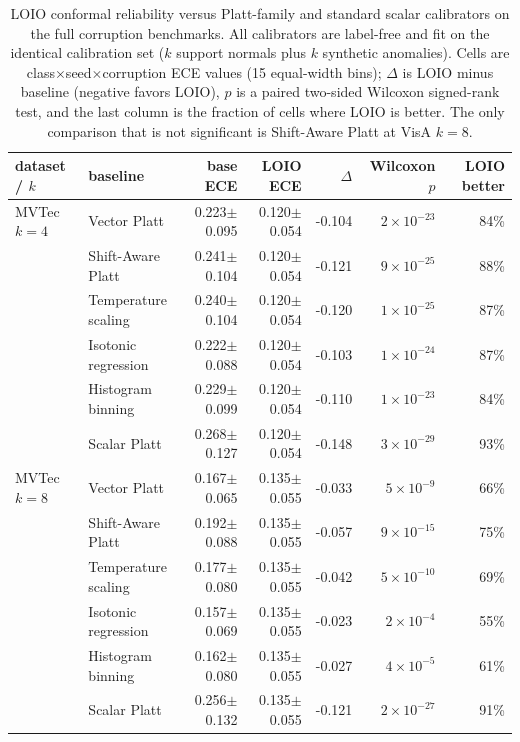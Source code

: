 \begin{table}[t]
\centering
\caption{LOIO conformal reliability versus Platt-family and standard scalar calibrators on the full corruption benchmarks. All calibrators are label-free and fit on the identical calibration set ($k$ support normals plus $k$ synthetic anomalies). Cells are class$\times$seed$\times$corruption ECE values (15 equal-width bins); $\Delta$ is LOIO minus baseline (negative favors LOIO), $p$ is a paired two-sided Wilcoxon signed-rank test, and the last column is the fraction of cells where LOIO is better. The only comparison that is not significant is Shift-Aware Platt at VisA $k{=}8$.}
\label{tab:scalar-calibrators}
\footnotesize
\setlength{\tabcolsep}{3pt}
\begin{tabular}{llrrrrr}
\toprule
dataset / $k$ & baseline & base ECE & LOIO ECE & $\Delta$ & Wilcoxon $p$ & LOIO better \\
\midrule
MVTec $k{=}4$ & Vector Platt & 0.223$\pm$0.095 & 0.120$\pm$0.054 & -0.104 & $2{\times}10^{-23}$ & 84\% \\
 & Shift-Aware Platt & 0.241$\pm$0.104 & 0.120$\pm$0.054 & -0.121 & $9{\times}10^{-25}$ & 88\% \\
 & Temperature scaling & 0.240$\pm$0.104 & 0.120$\pm$0.054 & -0.120 & $1{\times}10^{-25}$ & 87\% \\
 & Isotonic regression & 0.222$\pm$0.088 & 0.120$\pm$0.054 & -0.103 & $1{\times}10^{-24}$ & 87\% \\
 & Histogram binning & 0.229$\pm$0.099 & 0.120$\pm$0.054 & -0.110 & $1{\times}10^{-23}$ & 84\% \\
 & Scalar Platt & 0.268$\pm$0.127 & 0.120$\pm$0.054 & -0.148 & $3{\times}10^{-29}$ & 93\% \\
\addlinespace[2pt]
MVTec $k{=}8$ & Vector Platt & 0.167$\pm$0.065 & 0.135$\pm$0.055 & -0.033 & $5{\times}10^{-9}$ & 66\% \\
 & Shift-Aware Platt & 0.192$\pm$0.088 & 0.135$\pm$0.055 & -0.057 & $9{\times}10^{-15}$ & 75\% \\
 & Temperature scaling & 0.177$\pm$0.080 & 0.135$\pm$0.055 & -0.042 & $5{\times}10^{-10}$ & 69\% \\
 & Isotonic regression & 0.157$\pm$0.069 & 0.135$\pm$0.055 & -0.023 & $2{\times}10^{-4}$ & 55\% \\
 & Histogram binning & 0.162$\pm$0.080 & 0.135$\pm$0.055 & -0.027 & $4{\times}10^{-5}$ & 61\% \\
 & Scalar Platt & 0.256$\pm$0.132 & 0.135$\pm$0.055 & -0.121 & $2{\times}10^{-27}$ & 91\% \\

\end{tabular}
\end{table}
